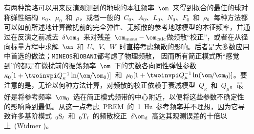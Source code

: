 有两种策略可以用来反演观测到的地球的本征频率~$\om$~来得到拟合的最佳的球对称弹性结构~$\kappa_0$、$\mu_0$~和~$\rho$，或者一般的~$C_0$、$A_0$、$L_0$、$N_0$、$F_0$~和~$\rho$。每种方法都可以如前所述地计算微扰前的完全弹性、无频散的参考地球模型的本征频率，并通过在反演之前减去~$\delta\om_d$~来对残差~$\om_{\rm meas}
-\om_{\rm calc}$做频散“校正”，或者在从径向标量方程中求解~$\om$~和~$U$、$V$、$W$~时直接考虑频散的影响。后者是大多数应用中首选的做法；{\tt MINEOS\/}和{\tt OBANI\/}都考虑了物理频散，
%
%
因而所有简正模式所“感觉到”的都是在微扰前的振荡频率~$\om$~下的实数各向同性弹性参数~$\kappa_0[1+\twoinvpi Q_{\kappa}^{-1}\ln
(\om\hspace{-0.2 mm}/\hspace{-0.2 mm}\om_0)]$~和~$\mu_0[1+\twoinvpi Q_{\mu}^{-1}
\ln(\om\hspace{-0.2 mm}/\hspace{-0.2 mm}\om_0)]$。要注意的是，无论以何种方法计算，对频散的校正依赖于衰减模型~$Q_{\kappa}$~和~$Q_{\mu}$。最好是将参考频率~$\om_0$~选在简正模式频带的中心附近，以便将这些参数不确定性的影响降到最低。从这一点考虑~PREM~的~1~Hz~参考频率并不理想，因为它导致许多基阶模式~${}_0{\rm S}_l$~和~${}_0{\rm T}_l$~的频散校正~$\delta\om_{\rm d}$~高达其观测误差的十倍以上~(Widmer \citeyear{widmer91})。

